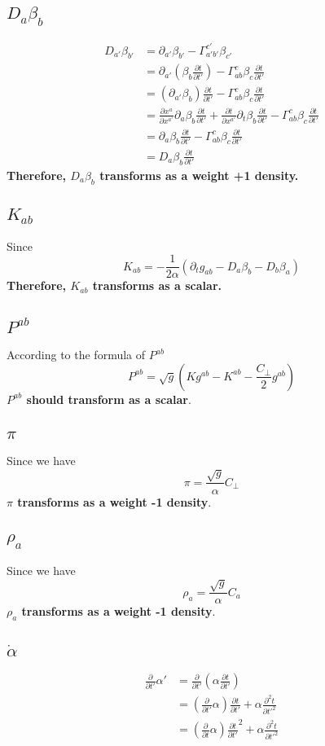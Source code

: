 \documentclass{article}
\begin{document}
\subsection{$D_{a}\beta_{b}$}
\begin{align*}
D_{a'}\beta_{b'} & = \partial_{a'}\beta_{b'} - \Gamma^{c'}_{a'b'}\beta_{c'}\\
& = \partial_{a'}(\beta_{b}\frac{\partial t}{\partial t'}) - \Gamma^{c}_{ab}\beta_{c}\frac{\partial t}{\partial t'}\\
& = (\partial_{a'}\beta_{b})\frac{\partial t}{\partial t'} - \Gamma^{c}_{ab}\beta_{c}\frac{\partial t}{\partial t'}\\
& = \frac{\partial x^{a}}{\partial x^{a'}}\partial_{a}\beta_{b}\frac{\partial t}{\partial t'} + \frac{\partial t}{\partial x^{a'}}\partial_{t}\beta_{b}\frac{\partial t}{\partial t'} - \Gamma^{c}_{ab}\beta_{c}\frac{\partial t}{\partial t'}\\
& = \partial_{a}\beta_{b}\frac{\partial t}{\partial t'} -  \Gamma^{c}_{ab}\beta_{c}\frac{\partial t}{\partial t'}\\
& = D_{a}\beta_{b}\frac{\partial t}{\partial t'}
\end{align*}
{\bf {\color{red}Therefore, $D_{a}\beta_{b}$ transforms as a weight +1 density.}}
\subsection{$K_{ab}$}
Since
\[
K_{ab} = -\frac{1}{2\alpha}(\partial_{t}g_{ab} - D_{a}\beta_{b} - D_{b}\beta_{a})
\]
{\bf {\color{red}Therefore, $K_{ab}$ transforms as a scalar.}}
\subsection{$P^{ab}$}
According to the formula of $P^{ab}$
\[
P^{ab} = \sqrt{g}(Kg^{ab} - K^{ab} -\frac{C_{\perp}}{2}g^{ab})
\]
{\bf {\color{red} $P^{ab}$ should transform as a scalar}}.
\subsection{$\pi$}
Since we have
\[
\pi = \frac{\sqrt{g}}{\alpha}C_{\perp}
\]
{\bf{\color{red}$\pi$ transforms as a weight -1 density}}.
\subsection{$\rho_{a}$}
Since we have
\[
\rho_{a} = \frac{\sqrt{g}}{\alpha}C_{a}
\]
{\bf{\color{red}$\rho_{a}$ transforms as a weight -1 density}}.
\subsection{${\dot \alpha}$}
\begin{align*}
\frac{\partial}{\partial t'}\alpha'& = \frac{\partial}{\partial t'}(\alpha\frac{\partial t}{\partial t'})\\
& = (\frac{\partial}{\partial t'}\alpha)\frac{\partial t}{\partial t'} + \alpha\frac{\partial^2 t}{{\partial t'}^2}\\
& = (\frac{\partial }{\partial t}\alpha){\frac{\partial t}{\partial t'}}^2 +  \alpha\frac{\partial^2 t}{{\partial t'}^2}
\end{align*}
\end{document}
